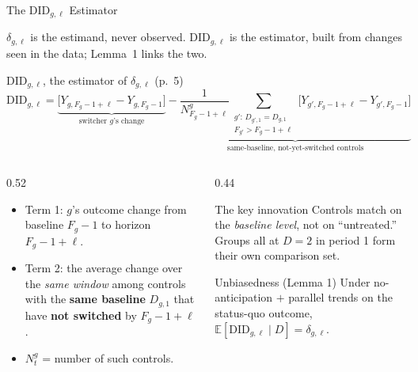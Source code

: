\documentclass[main.tex]{subfiles}
\begin{document}
\begin{frame}{The $\text{DID}_{g,\ell}$ Estimator}

  \footnotesize
  $\delta_{g,\ell}$ is the estimand, never observed. $\text{DID}_{g,\ell}$ is
  the estimator, built from changes seen in the data; Lemma~1 links the two.

  \begin{defbox}{$\text{DID}_{g,\ell}$, the estimator of $\delta_{g,\ell}$ (p.~5)}
  \small
  \[
    \text{DID}_{g,\ell}
      = \underbrace{\big[Y_{g,F_g-1+\ell} - Y_{g,F_g-1}\big]}_{\text{switcher } g\text{'s change}}
      - \underbrace{\frac{1}{N^g_{F_g-1+\ell}}\!\!\!\sum_{\substack{g':\, D_{g',1}=D_{g,1}\\ F_{g'} > F_g-1+\ell}}\!\!\!\big[Y_{g',F_g-1+\ell} - Y_{g',F_g-1}\big]}_{\text{same-baseline, not-yet-switched controls}}
  \]
  \end{defbox}

  \medskip
  \begin{columns}[T]
    \begin{column}{0.52\textwidth}
      \begin{itemize}\footnotesize
        \item Term 1: $g$'s outcome change from baseline $F_g-1$ to
          horizon $F_g-1+\ell$.
        \item Term 2: the average change over the \emph{same window}
          among controls with the \textbf{same baseline} $D_{g,1}$
          that have \textbf{not switched} by $F_g-1+\ell$.
        \item $N^g_t$ = number of such controls.
      \end{itemize}
    \end{column}
    \begin{column}{0.44\textwidth}
      \begin{block}{\footnotesize The key innovation}
        \footnotesize
        Controls match on the \emph{baseline level}, not on
        ``untreated.'' Groups all at $D{=}2$ in period 1 form their
        own comparison set.
      \end{block}

      \smallskip
      \begin{exampleblock}{\footnotesize Unbiasedness (Lemma 1)}
        \footnotesize
        Under no-anticipation $+$ parallel trends on the status-quo
        outcome, $\mathbb{E}[\text{DID}_{g,\ell}\mid D]=\delta_{g,\ell}$.
      \end{exampleblock}
    \end{column}
  \end{columns}
\end{frame}
\end{document}
